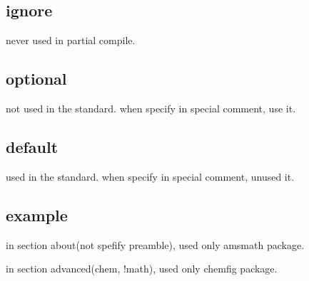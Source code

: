 \documentclass[a4j,uplatex,dvipdfmx]{jsarticle}
\begin{document}
\subsection{ignore}

never used in partial compile.

\subsection{optional}

not used in the standard.
when specify in special comment, use it.

\subsection{default}

used in the standard.
when specify in special comment, unused it.

\subsection{example}

in section about(not spefify preamble), used only amsmath package.

in section advanced(chem, !math), used only chemfig package.
\end{document}
